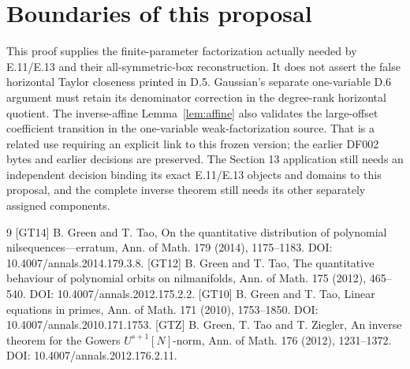 \documentclass[11pt]{article}
\begin{document}
\section{Boundaries of this proposal}
This proof supplies the finite-parameter factorization actually needed by
E.11/E.13 and their all-symmetric-box reconstruction. It does not assert
the false horizontal Taylor closeness printed in D.5. Gaussian's separate
one-variable D.6 argument must retain its denominator correction in the
degree-rank horizontal quotient.
The inverse-affine Lemma~\ref{lem:affine} also validates the large-offset
coefficient transition in the one-variable weak-factorization source.
That is a related use requiring an explicit link to this frozen version;
the earlier DF002 bytes and earlier decisions are preserved.
The Section 13 application still needs an independent decision binding its
exact E.11/E.13 objects and domains to this proposal, and the complete
inverse theorem still needs its other separately assigned components.

\begin{thebibliography}{9}
[GT14] B. Green and T. Tao, On the quantitative distribution
of polynomial nilsequences---erratum, Ann. of Math. 179 (2014), 1175--1183.
DOI: 10.4007/annals.2014.179.3.8.
[GT12] B. Green and T. Tao, The quantitative behaviour of
polynomial orbits on nilmanifolds, Ann. of Math. 175 (2012), 465--540.
DOI: 10.4007/annals.2012.175.2.2.
[GT10] B. Green and T. Tao, Linear equations in primes,
Ann. of Math. 171 (2010), 1753--1850. DOI: 10.4007/annals.2010.171.1753.
[GTZ] B. Green, T. Tao and T. Ziegler, An inverse theorem for
the Gowers $U^{s+1}[N]$-norm, Ann. of Math. 176 (2012), 1231--1372.
DOI: 10.4007/annals.2012.176.2.11.
\end{thebibliography}
\end{document}
